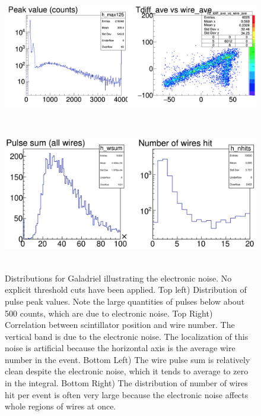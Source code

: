 \documentclass[12pt]{article}
\begin{document}
\begin{figure}[tbph]
\begin{center}
\includegraphics[height=6cm,clip=true]{Galadriel_R157_Th000_hists1}
\includegraphics[height=6cm,clip=true]{Galadriel_R157_Th000_hists2}
\caption{Distributions for Galadriel illustrating the electronic noise. No explicit threshold cuts have been applied. Top left) Distribution of pulse peak values. Note the large quantities of pulses below about 500 counts, which are due to electronic noise. Top Right) Correlation between scintillator position and wire number. The vertical band is due to the electronic noise. The localization of this noise is artificial because the horizontal axis is the average wire number in the event. Bottom Left) The wire pulse sum is relatively clean despite the electronic noise, which it tends to average to zero in the integral. Bottom Right) The distribution of number of wires hit per event is often very large because the electronic noise affects whole regions of wires at once. 
\label{fig:Galadriel_R157_Th000_hists}}
\end{center}
\end{figure} 
\end{document}
